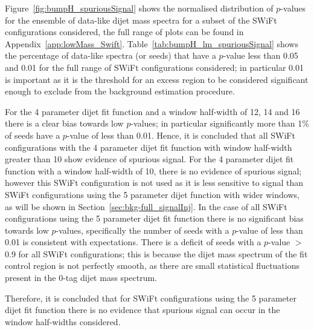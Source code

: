 Figure~\ref{fig:bumpH_spuriousSignal} shows the normalised distribution of \mbox{$p$-value}s for the ensemble of data-like dijet mass spectra
for a subset of the SWiFt configurations considered, the full range of plots can be found in Appendix~\ref{app:lowMass_Swift}.
Table~\ref{tab:bumpH_lm_spuriousSignal} shows the percentage of data-like spectra (or seeds)
that have a \bh{} \mbox{$p$-value} less than %
0.05 and 0.01 for the full range of SWiFt configurations considered;
in particular 0.01 is important as it is the threshold for an excess region to be considered significant enough
to exclude from the background estimation procedure.

For the 4 parameter dijet fit function and a window half-width of 12, 14 and 16
there is a clear bias towards low \bh{} \mbox{$p$-value}s;
in particular significantly more than 1\% of seeds have a \bh{} \mbox{$p$-value} of less than 0.01.
Hence, it is concluded that all SWiFt configurations with the 4 parameter dijet fit function with window half-width greater than 10
show evidence of spurious signal.
For the 4 parameter dijet fit function with a window half-width of 10, there is no evidence of spurious signal;
however this SWiFt configuration is not used as it is less sensitive to signal than SWiFt configurations
using the 5 parameter dijet function with wider windows, as will be shown in Section~\ref{sec:bkg-full_signalInj}.
In the case of all SWiFt configurations using the 5 parameter dijet fit function
there is no significant bias towards low \bh{} \mbox{$p$-value}s,
specifically the number of seeds with a \bh{} \mbox{$p$-value} of less than 0.01 is consistent with expectations.
There is a deficit of seeds with a \bh{} $p$-value $>$ 0.9 for all SWiFt configurations;
this is because the dijet mass spectrum of the fit control region is not perfectly smooth,
as there are small statistical fluctuations present in the 0-tag dijet mass spectrum.

Therefore, it is concluded that for SWiFt configurations using the 5 parameter dijet fit function
there is no evidence that spurious signal can occur in the window half-widths considered.

